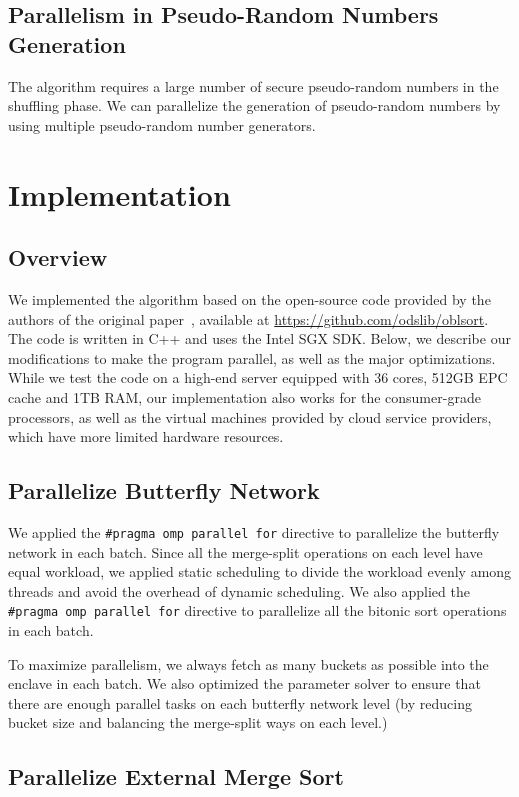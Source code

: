 \documentclass{article}
\begin{document}
\subsection{Parallelism in Pseudo-Random Numbers Generation}
The algorithm requires a large number of secure pseudo-random numbers in the shuffling phase. We can parallelize the generation of pseudo-random numbers by using multiple pseudo-random number generators.

\section{Implementation}
\subsection{Overview}
We implemented the algorithm based on the open-source code provided by the authors of the original paper~\cite{osort}, available at \url{https://github.com/odslib/oblsort}. The code is written in C++ and uses the Intel SGX SDK. Below, we describe our modifications to make the program parallel, as well as the major optimizations. While we test the code on a high-end server equipped with 36 cores, 512GB EPC cache and 1TB RAM, our implementation also works for the consumer-grade processors, as well as the virtual machines provided by cloud service providers, which have more limited hardware resources.
\subsection{Parallelize Butterfly Network}
We applied the {\tt \#pragma omp parallel for} directive to parallelize the butterfly network in each batch. Since all the merge-split operations on each level have equal workload, we applied static scheduling to divide the workload evenly among threads and avoid the overhead of dynamic scheduling. We also applied the {\tt \#pragma omp parallel for} directive to parallelize all the bitonic sort operations in each batch.

To maximize parallelism, we always fetch as many buckets as possible into the enclave in each batch. We also optimized the parameter solver to ensure that there are enough parallel tasks on each butterfly network level (by reducing bucket size and balancing the merge-split ways on each level.)

\subsection{Parallelize External Merge Sort}
\end{document}
